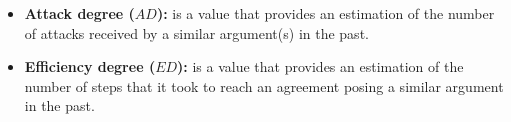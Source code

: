 \begin{itemize}
 \item\textbf{Attack degree ($AD$):} is a value that provides an estimation of the number of attacks received by a similar argument(s) in the past. %

 \item\textbf{Efficiency degree ($ED$):} is a value that provides an estimation of the number of steps that it took to reach an agreement posing a similar argument in the past. %


\end{itemize}
